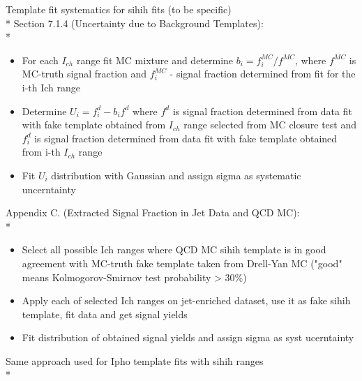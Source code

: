 \documentclass{beamer}
\begin{document}
\begin{frame}{Template fit systematics for sihih fits (to be specific)}\\*
  \scriptsize Section 7.1.4 (Uncertainty due to Background Templates):\\*
    \begin{itemize}
      \item For each $I_{ch}$ range fit MC mixture and determine $b_{i}=f_{i}^{MC}/f^{MC}$, where $f^{MC}$ is MC-truth signal fraction and $f_{i}^{MC}$ - signal fraction determined from fit for the i-th Ich range
      \item Determine $U_{i}=f_{i}^{d}-b_{i}f^{d}$ where $f^{d}$ is signal fraction determined from data fit with fake template obtained from $I_{ch}$ range selected from MC closure test and $f_{i}^{d}$ is signal fraction determined from data fit with fake template obtained from i-th $I_{ch}$ range
      \item Fit $U_{i}$ distribution with Gaussian and assign sigma as systematic uncerntainty
    \end{itemize}
  \scriptsize Appendix C. (Extracted Signal Fraction in Jet Data and QCD MC):\\*
    \begin{itemize}
      \item Select all possible Ich ranges where QCD MC sihih template is in good agreement with MC-truth fake template taken from Drell-Yan MC ("good" means Kolmogorov-Smirnov test probability > 30\%)  
      \item Apply each of selected Ich ranges on jet-enriched dataset, use it as fake sihih template, fit data and get signal yields   
      \item Fit distribution of obtained signal yields and assign sigma as syst ucerntainty 
    \end{itemize}
  \scriptsize Same approach used for Ipho template fits with sihih ranges\\*
\end{frame}

\end{document}
